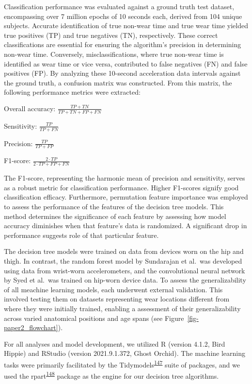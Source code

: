 \documentclass[
  10pt,
]{scrbook}
\begin{document}
Classification performance was evaluated against a ground truth test
dataset, encompassing over 7 million epochs of 10 seconds each, derived
from 104 unique subjects. Accurate identification of true non-wear time
and true wear time yielded true positives (TP) and true negatives (TN),
respectively. These correct classifications are essential for ensuring
the algorithm's precision in determining non-wear time. Conversely,
misclassifications, where true non-wear time is identified as wear time
or vice versa, contributed to false negatives (FN) and false positives
(FP). By analyzing these 10-second acceleration data intervals against
the ground truth, a confusion matrix was constructed. From this matrix,
the following performance metrics were extracted:

Overall accuracy: \(\frac{TP+TN}{TP+TN+FP+FN}\)

Sensitivity: \(\frac{TP}{TP+FN}​\)

Precision: \(\frac{TP}{TP+FP}\)

\hspace{0pt}F1-score: \(\frac{2 \cdot TP}{2 \cdot TP+FP+FN}​\)

The F1-score, representing the harmonic mean of precision and
sensitivity, serves as a robust metric for classification performance.
Higher F1-scores signify good classification efficacy. Furthermore,
permutation feature importance was employed to assess the performance of
the features of the decision tree models. This method determines the
significance of each feature by assessing how model accuracy diminishes
when that feature's data is randomized. A significant drop in
performance suggests role of that particular feature.

The decision tree models were trained on data from devices worn on the
hip and thigh. In contrast, the random forest model by Sundarajan et
al.~was developed using data from wrist-worn accelerometers, and the
convolutional neural network by Syed et al.~was trained on hip-worn
device data. To assess the generalizability of all meachine learning
models, each underwent external validation. This involved testing them
on datasets representing wear locations different from where they were
initially trained, enabling a assessment of their generalizability
across varied anatomical positions and age spans (see
Figure~\ref{fig-paper2_flowchart}).

For all analyses and model development, we utilized R (version 4.1.2,
Bird Hippie) and RStudio (version 2021.9.1.372, Ghost Orchid). The
machine learning tasks were primarily facilitated by the
Tidymodels\textsuperscript{\protect\hyperlink{ref-kuhn_tidymodels_2020}{147}}
suite of packages, and we used the
rpart\textsuperscript{\protect\hyperlink{ref-rpart}{148}} package as the
engine for our decision tree algorithms.
\end{document}
